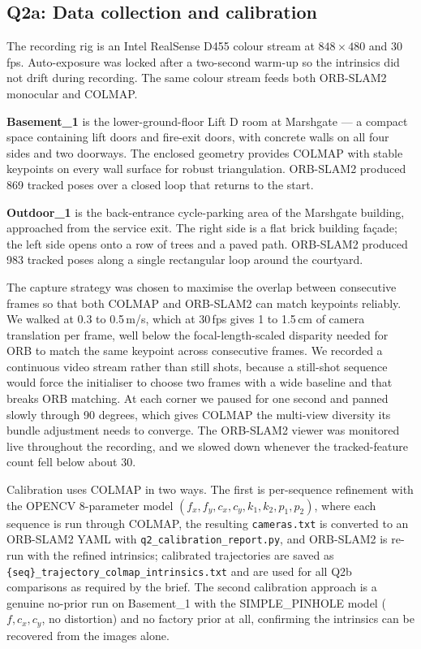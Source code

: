 \documentclass[twocolumn,10pt,a4paper]{article}
\begin{document}
\subsection{Q2a: Data collection and calibration}
\label{sec:q2a}

The recording rig is an Intel RealSense D455 colour stream at
$848 \times 480$ and 30\,fps. Auto-exposure was locked after a
two-second warm-up so the intrinsics did not drift during recording.
The same colour stream feeds both ORB-SLAM2 monocular and COLMAP.

\textbf{Basement\_1} is the lower-ground-floor Lift D room at Marshgate
--- a compact space containing lift doors and fire-exit doors, with
concrete walls on all four sides and two doorways. The enclosed
geometry provides COLMAP with stable keypoints on every wall surface
for robust triangulation. ORB-SLAM2 produced 869 tracked poses over a
closed loop that returns to the start.

\textbf{Outdoor\_1} is the back-entrance cycle-parking area of the
Marshgate building, approached from the service exit. The right side
is a flat brick building fa\c{c}ade; the left side opens onto a row
of trees and a paved path. ORB-SLAM2 produced 983 tracked poses along
a single rectangular loop around the courtyard.

The capture strategy was chosen to maximise the overlap between
consecutive frames so that both COLMAP and ORB-SLAM2 can match
keypoints reliably. We walked at 0.3 to 0.5\,m/s, which at 30\,fps
gives 1 to 1.5\,cm of camera translation per frame, well below the
focal-length-scaled disparity needed for ORB to match the same
keypoint across consecutive frames. We recorded a continuous video
stream rather than still shots, because a still-shot sequence would
force the initialiser to choose two frames with a wide baseline and
that breaks ORB matching. At each corner we paused for one second
and panned slowly through 90 degrees, which gives COLMAP the
multi-view diversity its bundle adjustment needs to converge. The
ORB-SLAM2 viewer was monitored live throughout the recording, and we
slowed down whenever the tracked-feature count fell below about 30.

Calibration uses COLMAP in two ways. The first is per-sequence
refinement with the OPENCV 8-parameter model
$(f_x, f_y, c_x, c_y, k_1, k_2, p_1, p_2)$, where each sequence is
run through COLMAP, the resulting \texttt{cameras.txt} is converted
to an ORB-SLAM2 YAML with \texttt{q2\_calibration\_report.py}, and
ORB-SLAM2 is re-run with the refined intrinsics; calibrated
trajectories are saved as
\texttt{\{seq\}\_trajectory\_colmap\_intrinsics.txt} and are used for
all Q2b comparisons as required by the brief. The second calibration
approach is a genuine no-prior run on Basement\_1 with the
SIMPLE\_PINHOLE model ($f, c_x, c_y$, no distortion) and no factory
prior at all, confirming the intrinsics can be recovered from the
images alone.
\end{document}
